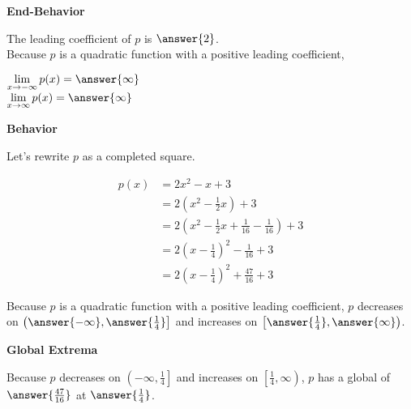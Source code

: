 \documentclass{ximera}
\begin{document}
\begin{exercise}
\begin{question}  \textbf{\textcolor{blue!55!black}{End-Behavior}}


The leading coefficient of $p$ is $\answer{2}$. \\


Because $p$ is a quadratic function with a positive leading coefficient,

$\lim\limits_{x \to -\infty} p(x) = \answer{\infty}$ \\


$\lim\limits_{x \to \infty} p(x) = \answer{\infty}$ \\

\end{question}




\begin{question}  \textbf{\textcolor{blue!55!black}{Behavior}}

Let's rewrite $p$ as a completed square.


\begin{align*}
p(x) & = 2x^2 - x + 3 \\
& = 2 (x^2 - \frac{1}{2} x) + 3  \\
& = 2 (x^2 - \frac{1}{2} x + \frac{1}{16} - \frac{1}{16}) + 3  \\
& = 2 (x - \frac{1}{4})^2 - \frac{1}{16} + 3  \\
& = 2 (x - \frac{1}{4})^2 + \frac{47}{16} + 3  
\end{align*}



Because $p$ is a quadratic function with a positive leading coefficient, $p$ decreases on $\left( \answer{-\infty}, \answer{\frac{1}{4}} \right]$ and increases on $\left[ \answer{\frac{1}{4}}, \answer{\infty} \right)$. 

\end{question}









\begin{question}  \textbf{\textcolor{blue!55!black}{Global Extrema}}

Because $p$ decreases on $\left( -\infty, \frac{1}{4} \right]$ and increases on $\left[ \frac{1}{4}, \infty \right)$, $p$ has a global   of $\answer{\frac{47}{16}}$ at $\answer{\frac{1}{4}}$.




\end{question}
\end{exercise}
\end{document}

